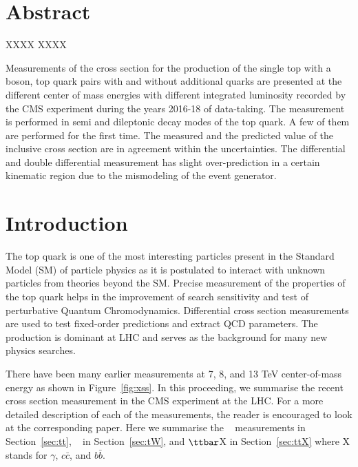 \section*{Abstract}
{\bf

XXXX \PQt XXXX

Measurements of the cross section for the production of the single top with a \PW boson, top quark 
pairs with and without additional quarks are presented at the different center of mass energies 
with different integrated luminosity recorded by the CMS experiment during the years 2016-18 of 
data-taking. The 
measurement is performed in semi and dileptonic decay modes of the top quark. A few of them 
are performed for the first time. The measured and the predicted value of the inclusive cross 
section are in agreement within the uncertainties. The differential and double differential
measurement has slight over-prediction in a certain kinematic region due to the mismodeling of 
the event generator.
}

\section{Introduction}
\label{sec:intro}
The top quark is one of the most interesting particles present in the Standard Model (SM) of
particle physics as it is postulated to interact with unknown particles from theories beyond the 
SM. Precise measurement of the properties of the top quark helps in the improvement of 
search sensitivity and test of perturbative Quantum Chromodynamics. Differential cross section 
measurements are used to test fixed-order predictions and extract QCD parameters. The \ttbar~ 
production is dominant at LHC and serves as the background for many new physics searches.

There have been many earlier measurements at 7, 8, and 13 TeV center-of-mass energy 
as shown in Figure~\ref{fig:xss}. 
In this proceeding, we summarise the recent cross section measurement in the CMS experiment at the
LHC. For a more detailed description of each of the measurements, the reader is encouraged to look
at the corresponding paper. Here we summarise the \ttbar~ measurements in Section~\ref{sec:tt},
\PQt\PW~ in Section~\ref{sec:tW}, and $\ttbar$X in Section~\ref{sec:ttX} where X stands for $\gamma$, $c\bar{c}$, and $b\bar{b}$.

